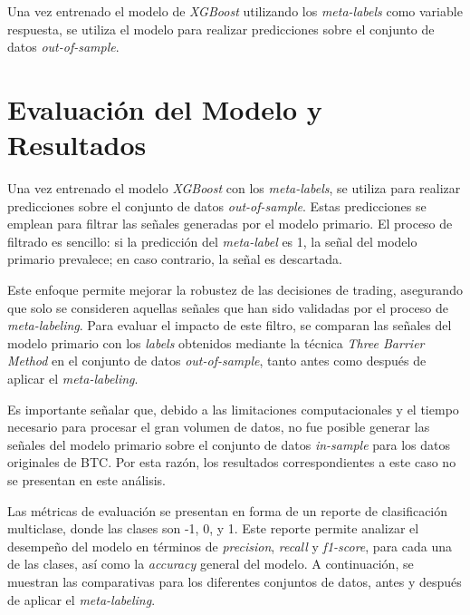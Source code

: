 \documentclass[a4paper,12pt, twoside]{report}
\begin{document}
Una vez entrenado el modelo de \textit{XGBoost} utilizando los \textit{meta-labels} como 
variable respuesta, se utiliza el modelo para realizar predicciones sobre el conjunto de 
datos \textit{out-of-sample}. 


\section{Evaluación del Modelo y Resultados}

Una vez entrenado el modelo \textit{XGBoost} con los \textit{meta-labels}, se utiliza para realizar 
predicciones sobre el conjunto de datos \textit{out-of-sample}. Estas predicciones se emplean para 
filtrar las señales generadas por el modelo primario. El proceso de filtrado es sencillo: si la 
predicción del \textit{meta-label} es 1, la señal del modelo primario prevalece; en caso contrario, 
la señal es descartada.

Este enfoque permite mejorar la robustez de las decisiones de trading, asegurando que solo se 
consideren aquellas señales que han sido validadas por el proceso de \textit{meta-labeling}. Para 
evaluar el impacto de este filtro, se comparan las señales del modelo primario con los \textit{labels} 
obtenidos mediante la técnica \textit{Three Barrier Method} en el conjunto de 
datos \textit{out-of-sample}, tanto antes como después de aplicar el \textit{meta-labeling}.

Es importante señalar que, debido a las limitaciones computacionales y el tiempo necesario para 
procesar el gran volumen de datos, no fue posible generar las señales del modelo primario sobre el 
conjunto de datos \textit{in-sample} para los datos originales de BTC. Por esta razón, los 
resultados correspondientes a este caso no se presentan en este análisis.

Las métricas de evaluación se presentan en forma de un reporte de clasificación multiclase, donde 
las clases son -1, 0, y 1. Este reporte permite analizar el desempeño del modelo en términos de 
\textit{precision}, \textit{recall} y \textit{f1-score}, para cada una de las clases, 
así como la \textit{accuracy} general del modelo. A continuación, se muestran las comparativas 
para los diferentes conjuntos de datos, antes y después de aplicar el \textit{meta-labeling}.
\end{document}
